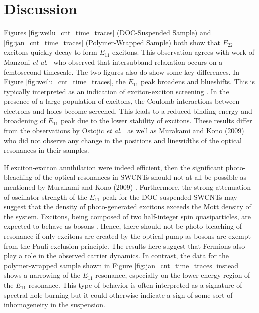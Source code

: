 \section{Discussion }


Figures \ref{fig:weilu_cnt_time_traces} (DOC-Suspended Sample) and \ref{fig:jan_cnt_time_traces} (Polymer-Wrapped Sample) both show that $E_{22}$ excitons quickly decay to form $E_{11}$ excitons. This observation agrees with work of Manzoni \textit{et al}.\ \cite{manzoni2005intersubband} who observed that intersubband relaxation occurs on a femtosecond timescale. The two figures also do show some key differences. In Figure \ref{fig:weilu_cnt_time_traces}, the $E_{11}$ peak broadens and blueshifts. This is typically interpreted as an indication of exciton-exciton screening \cite{shah1996ultrafast}. In the presence of a large population of excitons, the Coulomb interactions between electrons and holes become screened. This leads to a reduced binding energy and broadening of $E_{11}$ peak due to the lower stability of excitons. These results differ from the observations by Ostojic \textit{et al}.\ \cite{ostojic2005stability} as well as Murakami and Kono (2009) \cite{murakami2009existence} who did not observe any change in the positions and linewidths of the optical resonances in their samples.

If exciton-exciton annihilation were indeed efficient, then the significant photo-bleaching of the optical resonances in SWCNTs should not at all be possible as mentioned by Murakami and Kono (2009) \cite{murakami2009existence}. Furthermore, the strong attenuation of oscillator strength of the $E_{11}$ peak for the DOC-suspended SWCNTs may suggest that the density of photo-generated excitons exceeds the Mott density of the system. Excitons, being composed of two half-integer spin quasiparticles, are expected to behave as bosons \cite{Ashcroft, laikhtman2007excitons}. Hence, there should not be photo-bleaching of resonance if only excitons are created by the optical pump as bosons are exempt from the Pauli exclusion principle. The results here suggest that Fermions also play a role in the observed carrier dynamics. In contrast, the data for the polymer-wrapped sample shown in Figure \ref{fig:jan_cnt_time_traces} instead shows a narrowing of the $E_{11}$ resonance, especially on the lower energy region of the $E_{11}$ resonance. This type of behavior is often interpreted as a signature of spectral hole burning but it could otherwise indicate a sign of some sort of inhomogeneity in the suspension.

